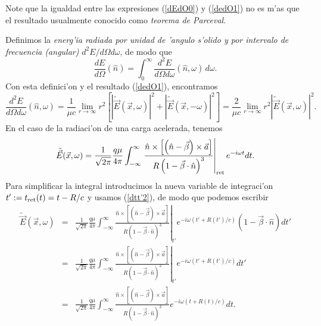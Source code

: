Note que la igualdad entre las expresiones (\ref{dEdO0}) y (\ref{dedO1}) no es m'as que el resultado usualmente conocido como \textit{teorema de Parceval}.

Definimos la\textit{ energ'ia radiada por unidad de 'angulo s'olido y por intervalo de frecuencia (angular)} ${d^2E}/{d\Omega d\omega}$, de modo que
\begin{equation}
\frac{dE}{d\Omega}(\hat{n})=\int_0^{\infty}\frac{d^2E}{d\Omega d\omega}(\hat{n},\omega)\,d\omega .
\end{equation}
Con esta definici'on y el resultado (\ref{dedO1}), encontramos
\begin{equation}
\frac{d^2E}{d\Omega d\omega}(\hat{n},\omega)=\frac{1}{\mu c}\lim_{r\to\infty}r^2\left[\left|\tilde{\vec{E}}(\vec{x},\omega)\right|^2 +\left|\tilde{\vec{E}}(\vec{x},-\omega)\right|^2\right]
=\frac{2}{\mu c}\lim_{r\to\infty}r^2\left|\tilde{\vec{E}}(\vec{x},\omega)\right|^2.
\end{equation}
En el caso de la radiaci'on de una carga acelerada, tenemos
\begin{equation}
\tilde{\vec{E}}(\vec{x},\omega)= \frac{1}{\sqrt{2\pi}}\frac{q\mu}{4\pi}\int_{-\infty}^{\infty
}\left.\frac{\hat{n}\times\left[ \left( \hat{n}-\vec{\beta}\right)
\times{\vec{a}}\right] }{R\left( 1-\vec{\beta}\cdot\hat{n}\right)
^3}\right|_{\rm ret}e^{-i\omega t}dt .
\end{equation}
Para simplificar la integral introducimos la nueva variable de integraci'on
$t':=t_{\rm ret}(t)=t-{R}/{c}$ y usamos (\ref{dtt'2}), de modo que podemos escribir
\begin{eqnarray}
\tilde{\vec{E}}(\vec{x},\omega)&=&\frac{1}{\sqrt{2\pi}}\frac{q\mu}{4\pi}\int_{-\infty}^{\infty
}\left.\frac{\hat{n}\times\left[ \left( \hat{n}-\vec{\beta}\right)
\times{\vec{a}}\right] }{R\left( 1-\vec{\beta}\cdot\hat{n}\right)
^3}\right|_{t'}e^{-i\omega (t'+R(t')/c)}\left(
1-\vec{\beta}\cdot\hat{n}\right) dt' \\
&=&\frac{1}{\sqrt{2\pi}}\frac{q\mu}{4\pi}\int_{-\infty}^{\infty
}\left.\frac{\hat{n}\times\left[ \left( \hat{n}-\vec{\beta}\right)
\times{\vec{a}}\right] }{R\left(1-\vec{\beta}\cdot\hat{n}\right)^2}
\right|_{t'}e^{-i\omega (t'+R(t')/c)} dt' \\
&=&\frac{1}{\sqrt{2\pi}}\frac{q\mu}{4\pi}\int_{-\infty}^{\infty
}\frac{\hat{n}\times\left[ \left( \hat{n}-\vec{\beta}\right)
\times{\vec{a}}\right] }{R\left( 1-\vec{\beta}\cdot\hat{n}\right)^2}
e^{-i\omega (t+R(t)/c)} dt.
\end{eqnarray}
